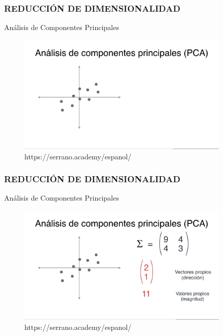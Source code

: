 \documentclass{beamer}
\begin{document}
\begin{frame}
	\frametitle{REDUCCIÓN DE DIMENSIONALIDAD}
	\begin{block}{Análisis de Componentes Principales}	
		\begin{figure}
			\includegraphics[width=0.9\textwidth]{PCA/IMG_3581.jpg}
			\caption{https://serrano.academy/espanol/}
		\end{figure}
	\end{block}
\end{frame}

\begin{frame}
	\frametitle{REDUCCIÓN DE DIMENSIONALIDAD}
	\begin{block}{Análisis de Componentes Principales}	
		\begin{figure}
			\includegraphics[width=0.9\textwidth]{PCA/IMG_3582.jpg}
			\caption{https://serrano.academy/espanol/}
		\end{figure}
	\end{block}
\end{frame}
\end{document}
